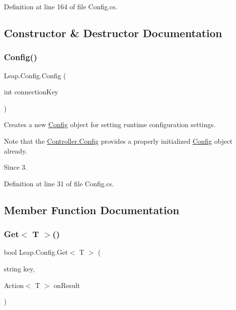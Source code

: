 Definition at line 164 of file Config.\+cs.



\subsection{Constructor \& Destructor Documentation}
\mbox{\label{class_leap_1_1_config_a5e0c85350a233e20b508189204fde82f}} 
\subsubsection{\texorpdfstring{Config()}{Config()}}
{\footnotesize\ttfamily Leap.\+Config.\+Config (\begin{DoxyParamCaption}\item[{int}]{connection\+Key }\end{DoxyParamCaption})}



Creates a new \mbox{\hyperlink{class_leap_1_1_config}{Config}} object for setting runtime configuration settings. 

Note that the \mbox{\hyperlink{class_leap_1_1_controller_a12503273371b21d58952a99b5fc5b0d9}{Controller.\+Config}} provides a properly initialized \mbox{\hyperlink{class_leap_1_1_config}{Config}} object already. \begin{DoxySince}{Since}
3. 
\end{DoxySince}


Definition at line 31 of file Config.\+cs.



\subsection{Member Function Documentation}
\mbox{\label{class_leap_1_1_config_a4196147f26b176afb93dc165fedfc8d0}} 
\subsubsection{\texorpdfstring{Get$<$ T $>$()}{Get< T >()}}
{\footnotesize\ttfamily bool Leap.\+Config.\+Get$<$ T $>$ (\begin{DoxyParamCaption}\item[{string}]{key,  }\item[{Action$<$ T $>$}]{on\+Result }\end{DoxyParamCaption})}



